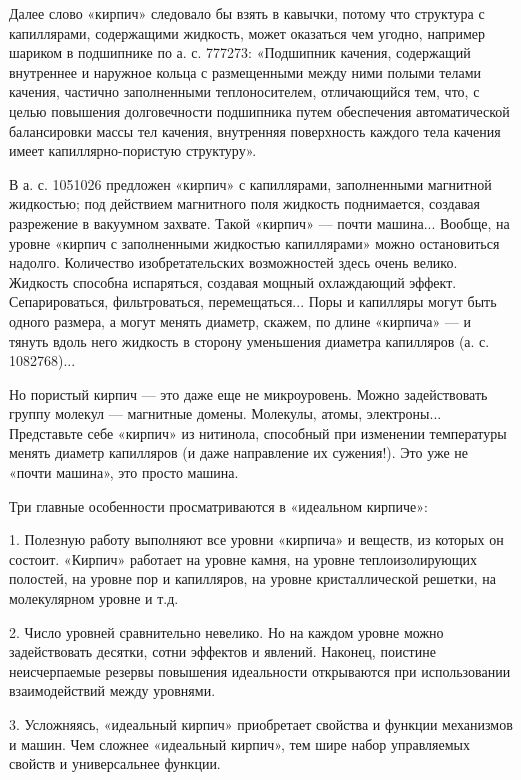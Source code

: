 Далее  слово  «кирпич»  следовало  бы  взять  в  кавычки,  потому  что
структура  с капиллярами,  содержащими жидкость,  может оказаться  чем
угодно,  например шариком  в подшипнике  по а.  с. 777273:  «Подшипник
качения, содержащий внутреннее и  наружное кольца с размещенными между
ними  полыми  телами  качения, частично  заполненными  теплоносителем,
отличающийся  тем, что,  с  целью  повышения долговечности  подшипника
путем  обеспечения  автоматической  балансировки  массы  тел  качения,
внутренняя поверхность каждого  тела качения имеет капиллярно-пористую
структуру».

В  а.  с.  1051026  предложен  «кирпич»  с  капиллярами,  заполненными
магнитной   жидкостью;   под   действием  магнитного   поля   жидкость
поднимается, создавая разрежение в вакуумном захвате. Такой «кирпич» —
почти  машина... Вообще,  на уровне  «кирпич с  заполненными жидкостью
капиллярами» можно  остановиться надолго.  Количество изобретательских
возможностей  здесь   очень  велико.  Жидкость   способна  испаряться,
создавая  мощный  охлаждающий эффект.  Сепарироваться,  фильтроваться,
перемещаться... Поры  и капилляры могут  быть одного размера,  а могут
менять  диаметр, скажем,  по длине  «кирпича»  — и  тянуть вдоль  него
жидкость в сторону уменьшения диаметра капилляров (а. с. 1082768)...

Но пористый кирпич — это даже еще не микроуровень. Можно задействовать
группу  молекул  —  магнитные домены.  Молекулы,  атомы,  электроны...
Представьте  себе  «кирпич»  из   нитинола,  способный  при  изменении
температуры  менять   диаметр  капилляров   (и  даже   направление  их
сужения!). Это уже не «почти машина», это просто машина.

Три главные особенности просматриваются в «идеальном кирпиче»:


1.  Полезную  работу выполняют  все  уровни  «кирпича» и  веществ,  из
которых  он состоит.  «Кирпич»  работает на  уровне  камня, на  уровне
теплоизолирующих  полостей,  на уровне  пор  и  капилляров, на  уровне
кристаллической решетки, на молекулярном уровне и т.д.

2.  Число   уровней  сравнительно   невелико.  Но  на   каждом  уровне
можно  задействовать  десятки,  сотни  эффектов  и  явлений.  Наконец,
поистине неисчерпаемые  резервы повышения идеальности  открываются при
использовании взаимодействий между уровнями.

3.  Усложняясь,  «идеальный  кирпич» приобретает  свойства  и  функции
механизмов и  машин. Чем  сложнее «идеальный  кирпич», тем  шире набор
управляемых свойств и универсальнее функции.

